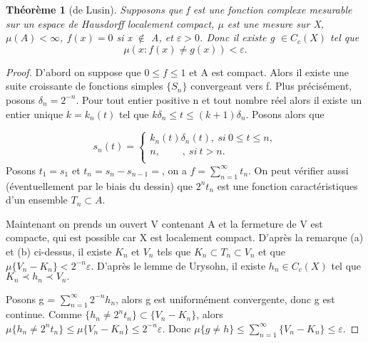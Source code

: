 \documentclass{article}
\newtheorem{theorem}{Théorème}[section]
\begin{document}
\begin{theorem}[de Lusin]
    Supposons que f est une fonction complexe mesurable sur un espace de Hausdorff localement compact, $\mu$ est une mesure sur X, $\mu (A) < \infty$, $f(x) = 0$ si x $\notin$ A, et $\varepsilon >0$. Donc il existe g $\in C_{c}(X)$ tel que 
    \[\mu ({x: f(x) \neq g(x)}) < \varepsilon . \]

\end{theorem}

\begin{proof}
    D'abord on suppose que $0 \leq f \leq 1$ et A est compact. Alors il existe une suite croissante de fonctions simples $\{S_{n}\}$ convergeant vers f. Plus précisément, posons $\delta_{n} = 2^{-n}$. Pour tout entier positive n et tout nombre réel alors il existe un entier unique $k = k_{n}(t)$ tel que $ k\delta_{n} \leq t \leq (k+1)\delta_{n}$. Posons alors que 

    \[s_{n}(t) = \begin{cases}
      k_{n}(t)\delta_{n}(t), \ si\ 0\leq t \leq n, \\  
      n, \ \ \ \ \ \ \ \  \ \ ,\  si\ t > n. \\  
    \end{cases}
    \] 
    Posons $t_{1}= s_{1}$ et $t_{n} = s_{n} - s_{n-1} = $, on a $ f = \sum _{n=1}^{\infty} t_{n} $. On peut vérifier aussi (éventuellement par le biais du dessin) que $2^{n}t_{n}$ est une fonction caractéristiques d'un ensemble $T_{n} \subset A$. \par
    Maintenant on prends un ouvert V contenant A et la fermeture de V est compacte, qui est possible car X est localement compact.
     D'après la remarque (a) et (b) ci-dessus, il existe $K_{n}$ et $V_{n}$ tels que $K_{n} \subset T_{n} \subset V_{n}$ et que $\mu \{V_{n} - K_{n}\} < 2^{-n}\varepsilon$. D'après le lemme de Urysohn, il existe $h_{n} \in C_{c}(X)$ tel que $K_{n} \prec h_{n} \prec V_{n}.$ \par
    Posons g = $\sum_{n=1}^{\infty}2^{-n}h_{n}$, alors g est uniformément convergente, donc g est continue. Comme $\{h_{n} \neq 2^{n}t_{n}\} \subset \{V_{n} - K_{n}\}$, alors $\mu\{h_{n} \neq 2^{n}t_{n}\} \leq \mu\{V_{n} - K_{n}\} \leq 2^{-n}\varepsilon.$ Donc $\mu \{g \neq h\} \leq \sum_{n=1}^{\infty}\{V_{n} - K_{n}\} \leq \varepsilon.$ 

\end{proof}
\end{document}
